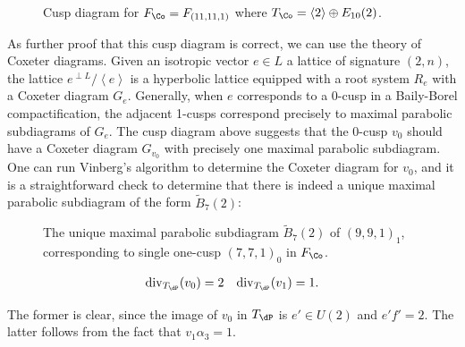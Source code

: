 \documentclass{amsart}
\renewcommand{\tilde}{\widetilde}
\begin{document}
\begin{remark}
\begin{figure}[H]
\centering

\caption{Cusp diagram for $F_\Co = F_{(11, 11, 1)}$ where $T_\Co = \left\langle{2}\right\rangle \oplus E_{10}(2)$.}
\label{fig:coble-cusp-diagram}
\end{figure}

\end{remark}

\begin{remark}

As further proof that this cusp diagram is correct, we can use the theory of Coxeter diagrams. Given an isotropic vector \(e\in L\) a lattice of signature \((2, n)\), the lattice \(e^{\perp L}/\left\langle{e}\right\rangle\) is a hyperbolic lattice equipped with a root system \(R_e\) with a Coxeter diagram \(G_e\). Generally, when \(e\) corresponds to a 0-cusp in a Baily-Borel compactification, the adjacent 1-cusps correspond precisely to maximal parabolic subdiagrams of \(G_e\). The cusp diagram above suggests that the 0-cusp \(v_0\) should have a Coxeter diagram \(G_{v_0}\) with precisely one maximal parabolic subdiagram. One can run Vinberg's algorithm to determine the Coxeter diagram for \(v_0\), and it is a straightforward check to determine that there is indeed a unique maximal parabolic subdiagram of the form \(\tilde B_7(2)\):

\begin{figure}[H]
\centering

\caption{The unique maximal parabolic subdiagram $\tilde B_7(2)$ of $(9,9,1)_1$, corresponding to single one-cusp $(7,7,1)_0$ in $F_\Co$.}
\label{fig:coble-cusp-9-9-1-parabolics}
\end{figure}

\end{remark}

\begin{remark}

\begin{align*} \operatorname{div}_{T_{\dP}}(v_0) = 2 && \operatorname{div}_{T_{\dP}}(v_1) = 1  .\end{align*}

The former is clear, since the image of \(v_0\) in \(T_{\dP}\) is \(e'\in U(2)\) and \(e'f' = 2\). The latter follows from the fact that \(v_1\alpha_3 = 1\).

\end{remark}
\end{document}
